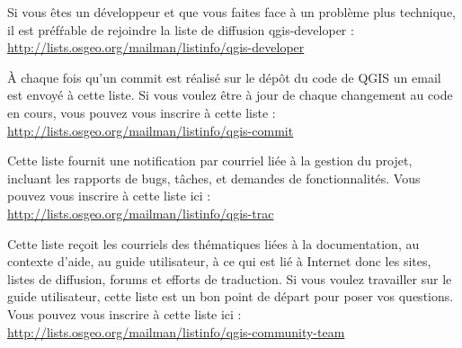 Si vous êtes un développeur et que vous faites face à un problème plus
technique, il est préf\'rable de rejoindre la liste de diffusion qgis-developer :\\
\url{http://lists.osgeo.org/mailman/listinfo/qgis-developer}

À chaque fois qu'un commit est réalisé sur le dépôt du code de QGIS un email
est envoyé à cette liste. Si vous voulez être à jour de chaque changement au
code en cours, vous pouvez vous inscrire à cette liste :\\
\url{http://lists.osgeo.org/mailman/listinfo/qgis-commit}

Cette liste fournit une notification par courriel liée à la gestion du projet,
incluant les rapports de bugs, tâches, et demandes de fonctionnalités. Vous
pouvez vous inscrire à cette liste ici :\\
\url{http://lists.osgeo.org/mailman/listinfo/qgis-trac}

Cette liste reçoit les courriels des thématiques liées à la documentation, au
contexte d'aide, au guide utilisateur, à ce qui est lié à Internet donc les
sites, listes de diffusion, forums et efforts de traduction. Si vous voulez
travailler sur le guide utilisateur, cette liste est un bon point de départ
pour poser vos questions. Vous pouvez vous inscrire à cette liste ici :\\
\url{http://lists.osgeo.org/mailman/listinfo/qgis-community-team}

